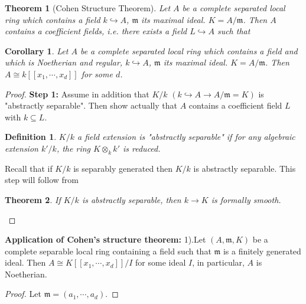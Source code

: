 \documentclass[cs4size]{article}
\newcommand{\su}{\subseteq}
\newcommand{\frm}{\mathfrak{m}}
\newcommand{\ra}{\rightarrow}
\newtheorem{thm}{Theorem}
\newtheorem{definition}{Definition}
\newtheorem{cor}{Corollary}
\begin{document}
\begin{thm}[Cohen Structure Theorem]
Let $A$ be a complete separated local ring which contains a field $k\hookrightarrow A$, $\frm$ its maximal ideal. $K=A/\frm$. Then $A$ contains a coefficient fields, i.e. there exists a field $L\hookrightarrow A$ such that
\end{thm}
\begin{cor}
Let $A$ be a complete separated local ring which contains a field and which is Noetherian and regular, $k\hookrightarrow A$, $\frm$ its maximal ideal. $K=A/\frm$. Then $A\cong k[[x_1,\cdots,x_d]]$ for some $d$.
\end{cor}
\begin{proof}
\textbf{Step 1: }Assume in addition that $K/k$ $(k\hookrightarrow A\ra A/\frm=K)$ is "abstractly separable". Then show actually that $A$ contains a coefficient field $L$ with $k\su L$.
\begin{definition}
$K/k$ a field extension is "abstractly separable" if for any algebraic extension $k'/k$, the ring $K\otimes_kk'$ is reduced.
\end{definition}
Recall that if $K/k$ is separably generated then $K/k$ is abstractly separable.
This step will follow from
\begin{thm}
If $K/k$ is abstractly separable, then $k\ra K$ is formally smooth.
\end{thm}
\end{proof}

\textbf{Application of Cohen's structure theorem: }
1).Let $(A,\frm,K)$ be a complete separable local ring containing a field such that $\frm$ is a finitely generated ideal. Then $A\cong K[[x_1,\cdots,x_d]]/I$ for some ideal $I$, in particular, $A$ is Noetherian.
\begin{proof}
Let $\frm=(a_1,\cdots,a_d)$.
\end{proof}
\end{document}
